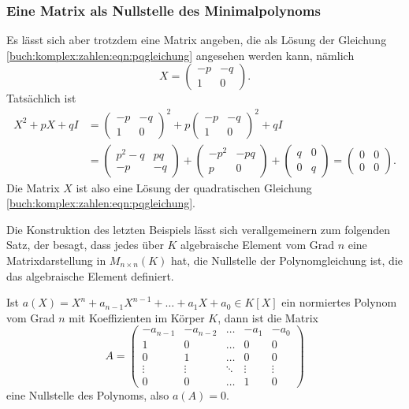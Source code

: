%
%
\subsubsection{Eine Matrix als Nullstelle des Minimalpolynoms}
Es lässt sich aber trotzdem eine Matrix angeben, die als Lösung
der Gleichung \eqref{buch:komplex:zahlen:eqn:pqgleichung} angesehen
werden kann, nämlich
\[
X
=
\begin{pmatrix}
-p & -q \\
 1 &  0
\end{pmatrix}.
\]
Tatsächlich ist
\begin{align*}
X^2 + pX + qI
&=
\begin{pmatrix}
-p & -q \\
 1 &  0
\end{pmatrix}^2
+
p
\begin{pmatrix}
-p & -q \\
 1 &  0
\end{pmatrix}^2
+qI
\\
&=
\begin{pmatrix}
p^2 - q & pq \\
   -p   & -q
\end{pmatrix}
+
\begin{pmatrix}
-p^2 & -pq \\
 p   &  0 
\end{pmatrix}
+
\begin{pmatrix}
q & 0 \\
0 & q
\end{pmatrix}
=
\begin{pmatrix}
0 & 0 \\
0 & 0
\end{pmatrix}.
\end{align*}
Die Matrix $X$ ist also eine Lösung der quadratischen Gleichung
\eqref{buch:komplex:zahlen:eqn:pqgleichung}.

Die Konstruktion des letzten Beispiels lässt sich verallgemeinern
zum folgenden Satz, der besagt, dass jedes über $K$ algebraische
Element vom Grad $n$ eine Matrixdarstellung in $M_{n\times n}(K)$
hat, die Nullstelle der Polynomgleichung ist, die das algebraische
Element definiert.

\begin{satz}
\label{buch:komplex:zahlen:satz:matrixalgebraisch}
Ist $a(X) = X^n + a_{n-1}X^{n-1}+\dots + a_1X+a_0 \in K[X]$ ein
normiertes Polynom vom Grad $n$ mit Koeffizienten im Körper $K$,
dann ist die Matrix
\[
A
=
\begin{pmatrix}
-a_{n-1} & -a_{n-2} & \dots  &  -a_1   &  -a_0   \\
    1    &     0    & \dots  &    0    &    0    \\
    0    &     1    & \dots  &    0    &    0    \\
 \vdots  &  \vdots  & \ddots &  \vdots &  \vdots \\
    0    &     0    & \dots  &    1    &    0 
\end{pmatrix}
\]
eine Nullstelle des Polynoms, also $a(A)=0$.
\end{satz}

